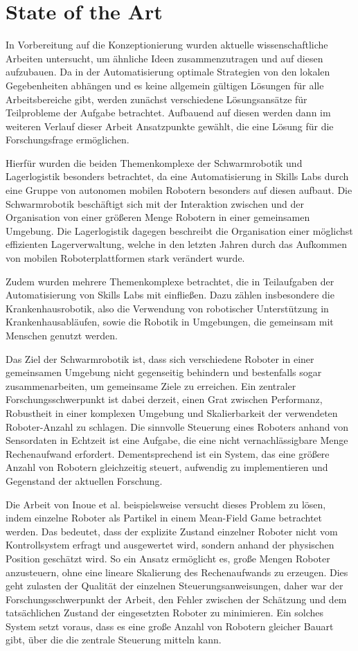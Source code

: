 \section{State of the Art}

In Vorbereitung auf die Konzeptionierung wurden aktuelle wissenschaftliche Arbeiten untersucht, um ähnliche Ideen zusammenzutragen und auf diesen aufzubauen. Da in der Automatisierung optimale Strategien von den lokalen Gegebenheiten abhängen und es keine allgemein gültigen Lösungen für alle Arbeitsbereiche gibt, werden zunächst verschiedene Lösungsansätze für Teilprobleme der Aufgabe betrachtet. Aufbauend auf diesen werden dann im weiteren Verlauf dieser Arbeit Ansatzpunkte gewählt, die eine Lösung für die Forschungsfrage ermöglichen.

Hierfür wurden die beiden Themenkomplexe der Schwarmrobotik und Lagerlogistik besonders betrachtet, da eine Automatisierung in Skills Labs durch eine Gruppe von autonomen mobilen Robotern besonders auf diesen aufbaut. Die Schwarmrobotik beschäftigt sich mit der Interaktion zwischen und der Organisation von einer größeren Menge Robotern in einer gemeinsamen Umgebung. Die Lagerlogistik dagegen beschreibt die Organisation einer möglichst effizienten Lagerverwaltung, welche in den letzten Jahren durch das Aufkommen von mobilen Roboterplattformen stark verändert wurde.

Zudem wurden mehrere Themenkomplexe betrachtet, die in Teilaufgaben der Automatisierung von Skills Labs mit einfließen. Dazu zählen insbesondere die Krankenhausrobotik, also die Verwendung von robotischer Unterstützung in Krankenhausabläufen, sowie die Robotik in Umgebungen, die gemeinsam mit Menschen genutzt werden.

Das Ziel der Schwarmrobotik ist, dass sich verschiedene Roboter in einer gemeinsamen Umgebung nicht gegenseitig behindern und bestenfalls sogar zusammenarbeiten, um gemeinsame Ziele zu erreichen. Ein zentraler Forschungsschwerpunkt ist dabei derzeit, einen Grat zwischen Performanz, Robustheit in einer komplexen Umgebung und Skalierbarkeit der verwendeten Roboter-Anzahl zu schlagen. Die sinnvolle Steuerung eines Roboters anhand von Sensordaten in Echtzeit ist eine Aufgabe, die eine nicht vernachlässigbare Menge Rechenaufwand erfordert. Dementsprechend ist ein System, das eine größere Anzahl von Robotern gleichzeitig steuert, aufwendig zu implementieren und Gegenstand der aktuellen Forschung.

Die Arbeit von Inoue et al. \cite{meanField} beispielsweise versucht dieses Problem zu lösen, indem einzelne Roboter als Partikel in einem Mean-Field Game betrachtet werden. Das bedeutet, dass der explizite Zustand einzelner Roboter nicht vom Kontrollsystem erfragt und ausgewertet wird, sondern anhand der physischen Position geschätzt wird. So ein Ansatz ermöglicht es, große Mengen Roboter anzusteuern, ohne eine lineare Skalierung des Rechenaufwands zu erzeugen. Dies geht zulasten der Qualität der einzelnen Steuerungsanweisungen, daher war der Forschungsschwerpunkt der Arbeit, den Fehler zwischen der Schätzung und dem tatsächlichen Zustand der eingesetzten Roboter zu minimieren. Ein solches System setzt voraus, dass es eine große Anzahl von Robotern gleicher Bauart gibt, über die die zentrale Steuerung mitteln kann.

